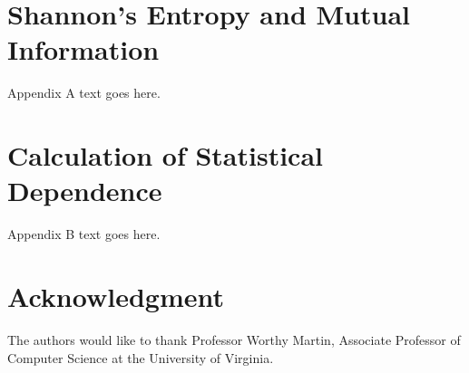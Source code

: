 \documentclass[journal]{./sty/IEEEtran}
\begin{document}
%


\appendices
\section{Shannon's Entropy and Mutual Information}
Appendix A text goes here.

\section{Calculation of Statistical Dependence}
Appendix B text goes here.


\section*{Acknowledgment}


The authors would like to thank Professor Worthy Martin, Associate Professor of Computer Science at the University of Virginia.


\ifCLASSOPTIONcaptionsoff
  \newpage
\fi




\end{document}
